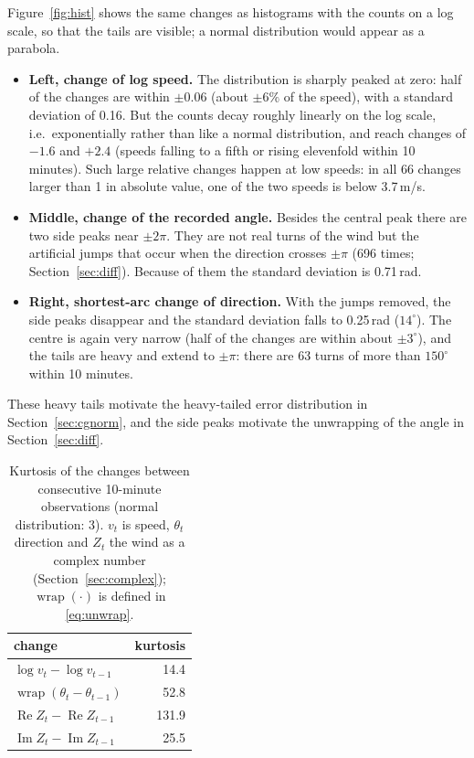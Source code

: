 \documentclass[11pt,a4paper]{article}
\DeclareMathOperator{\wrap}{wrap}
\renewcommand{\Re}{\operatorname{Re}}
\renewcommand{\Im}{\operatorname{Im}}
\begin{document}
Figure~\ref{fig:hist} shows the same changes as histograms with the counts on a log scale, so that
the tails are visible; a normal distribution would appear as a parabola.
\begin{itemize}
  \item \textbf{Left, change of log speed.} The distribution is sharply peaked at zero: half of the
    changes are within $\pm 0.06$ (about $\pm 6\%$ of the speed), with a standard deviation of
    0.16. But the counts decay roughly linearly on the log scale, i.e.\ exponentially rather than
    like a normal distribution, and reach changes of $-1.6$ and $+2.4$ (speeds falling to a fifth or
    rising elevenfold within 10 minutes). Such large relative changes happen at low speeds: in all 66
changes larger than 1 in absolute value, one of the two speeds is below 3.7\,m/s.
  \item \textbf{Middle, change of the recorded angle.} Besides the central peak there are two side
    peaks near $\pm 2\pi$. They are not real turns of the wind but the artificial jumps that occur
    when the direction crosses $\pm\pi$ (696 times; Section~\ref{sec:diff}). Because of them the
    standard deviation is 0.71\,rad.
  \item \textbf{Right, shortest-arc change of direction.} With the jumps removed, the side peaks
    disappear and the standard deviation falls to 0.25\,rad ($14^\circ$). The centre is again very
    narrow (half of the changes are within about $\pm 3^\circ$), and the tails are heavy and extend
    to $\pm\pi$: there are 63 turns of more than $150^\circ$ within 10 minutes.
\end{itemize}
These heavy tails motivate the heavy-tailed error distribution in
Section~\ref{sec:cgnorm}, and the side peaks motivate the unwrapping of the angle in
Section~\ref{sec:diff}.

\begin{table}[H]
  \centering
  \caption{Kurtosis of the changes between consecutive 10-minute observations (normal
    distribution: 3). $v_t$ is speed, $\theta_t$ direction and $Z_t$ the wind as a complex number
    (Section~\ref{sec:complex}); $\wrap(\cdot)$ is defined in \eqref{eq:unwrap}.}\label{tab:kurt}
  \begin{tabular}{lr}
    \toprule
    change & kurtosis \\
    \midrule
    $\log v_t - \log v_{t-1}$ & 14.4 \\
    $\wrap(\theta_t - \theta_{t-1})$ & 52.8 \\
    $\Re Z_t - \Re Z_{t-1}$ & 131.9 \\
    $\Im Z_t - \Im Z_{t-1}$ & 25.5 \\
    \bottomrule
  \end{tabular}
\end{table}
\end{document}
